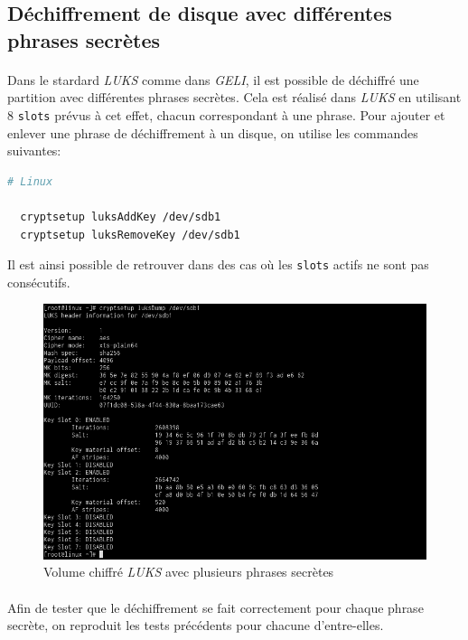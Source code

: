 \subsection{Déchiffrement de disque avec différentes phrases secrètes}
\paragraph{}
Dans le stardard \textit{LUKS} comme dans \textit{GELI}, il est possible de
déchiffré une partition avec différentes phrases secrètes. Cela est réalisé dans
\textit{LUKS} en utilisant 8 \texttt{slots} prévus à cet effet, chacun
correspondant à une phrase.
Pour ajouter et enlever une phrase de déchiffrement à un disque, on utilise les
commandes suivantes:
\\
\begin{lstlisting}[language=bash]
  # Linux

  cryptsetup luksAddKey /dev/sdb1
  cryptsetup luksRemoveKey /dev/sdb1
\end{lstlisting}
Il est ainsi possible de retrouver dans des cas où les \texttt{slots} actifs ne
sont pas consécutifs.
\begin{figure}[H]
  \centering
  \includegraphics[width=\linewidth]{tests/linux_multiple_passphrases.png}
  \caption{\label{fig:linux_multiple_passphrases}Volume chiffré \textit{LUKS}
    avec plusieurs phrases secrètes}
\end{figure}
\paragraph{}
Afin de tester que le déchiffrement se fait correctement pour chaque phrase
secrète, on reproduit les tests précédents pour chacune d'entre-elles.